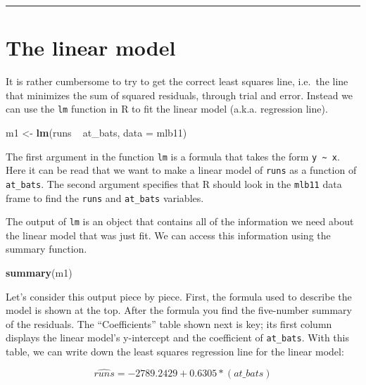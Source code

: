 \documentclass[]{book}
\newenvironment{Shaded}{\begin{snugshade}}{\end{snugshade}}
\newcommand{\KeywordTok}[1]{\textcolor[rgb]{0.13,0.29,0.53}{\textbf{{#1}}}}
\newcommand{\DataTypeTok}[1]{\textcolor[rgb]{0.13,0.29,0.53}{{#1}}}
\newcommand{\StringTok}[1]{\textcolor[rgb]{0.31,0.60,0.02}{{#1}}}
\newcommand{\NormalTok}[1]{{#1}}
\theoremstyle{definition}
\theoremstyle{definition}
\theoremstyle{definition}
\theoremstyle{remark}
\begin{document}
\begin{center}\rule{0.5\linewidth}{\linethickness}\end{center}

\section{The linear model}\label{the-linear-model}

It is rather cumbersome to try to get the correct least squares line,
i.e.~the line that minimizes the sum of squared residuals, through trial
and error. Instead we can use the \texttt{lm} function in R to fit the
linear model (a.k.a. regression line).

\begin{Shaded}
\begin{Highlighting}[]
\NormalTok{m1 <-}\StringTok{ }\KeywordTok{lm}\NormalTok{(runs ~}\StringTok{ }\NormalTok{at_bats, }\DataTypeTok{data =} \NormalTok{mlb11)}
\end{Highlighting}
\end{Shaded}

The first argument in the function \texttt{lm} is a formula that takes
the form \texttt{y\ \textasciitilde{}\ x}. Here it can be read that we
want to make a linear model of \texttt{runs} as a function of
\texttt{at\_bats}. The second argument specifies that R should look in
the \texttt{mlb11} data frame to find the \texttt{runs} and
\texttt{at\_bats} variables.

The output of \texttt{lm} is an object that contains all of the
information we need about the linear model that was just fit. We can
access this information using the summary function.

\begin{Shaded}
\begin{Highlighting}[]
\KeywordTok{summary}\NormalTok{(m1)}
\end{Highlighting}
\end{Shaded}

Let's consider this output piece by piece. First, the formula used to
describe the model is shown at the top. After the formula you find the
five-number summary of the residuals. The ``Coefficients'' table shown
next is key; its first column displays the linear model's y-intercept
and the coefficient of \texttt{at\_bats}. With this table, we can write
down the least squares regression line for the linear model:

\[
  \widehat{runs} = -2789.2429 + 0.6305 * (at\_bats)
\]
\end{document}
